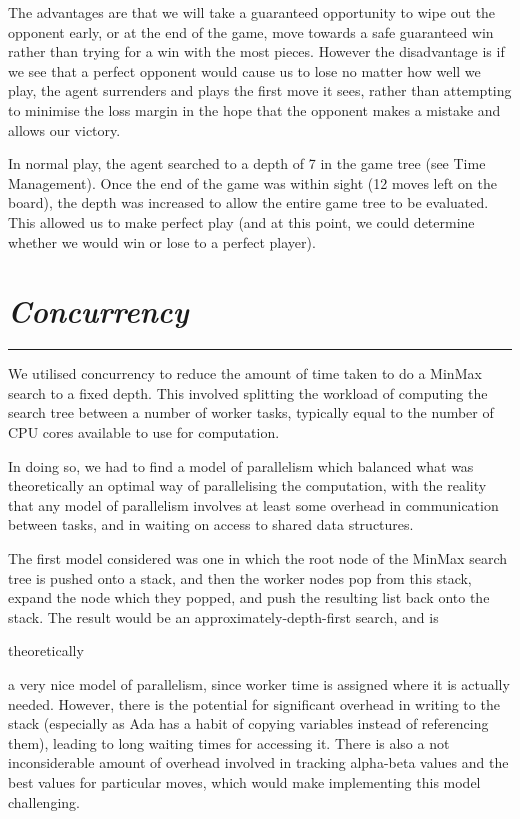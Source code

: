 \documentclass[10pt]{report}
\begin{document}
\begin{multicols}{2}
The advantages are that we will take a guaranteed opportunity to wipe out the opponent early, or at the end of the game, move towards a safe guaranteed win rather than trying for a win with the most pieces. However the disadvantage is if we see that a perfect opponent would cause us to lose no matter how well we play, the agent surrenders and plays the first move it sees, rather than attempting to minimise the loss margin in the hope that the opponent makes a mistake and allows our victory.

In normal play, the agent searched to a depth of 7 in the game tree (see Time Management). Once the end of the game was within sight (12 moves left on the board), the depth was increased to allow the entire game tree to be evaluated. This allowed us to make perfect play (and at this point, we could determine whether we would win or lose to a perfect player).
\section*{\emph{Concurrency}}
\hrule

We utilised concurrency to reduce the amount of time taken to do a MinMax search to a fixed depth. This involved splitting the workload of computing the search tree between a number of worker tasks, typically equal to the number of CPU cores available to use for computation.

In doing so, we had to find a model of parallelism which balanced what was theoretically an optimal way of parallelising the computation, with the reality that any model of parallelism involves at least some overhead in communication between tasks, and in waiting on access to shared data structures.

The first model considered was one in which the root node of the MinMax search tree is pushed onto a stack, and then the worker nodes pop from this stack, expand the node which they popped, and push the resulting list back onto the stack. The result would be an approximately-depth-first search, and is \begin{em} theoretically \end{em} a very nice model of parallelism, since worker time is assigned where it is actually needed. However, there is the potential for significant overhead in writing to the stack (especially as Ada has a habit of copying variables instead of referencing them), leading to long waiting times for accessing it. There is also a not inconsiderable amount of overhead involved in tracking alpha-beta values and the best values for particular moves, which would make implementing this model challenging.


\end{multicols}
\end{document}
